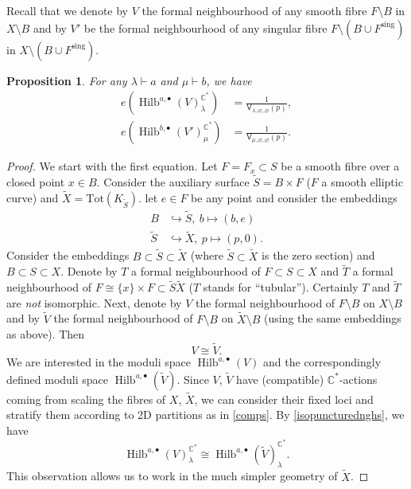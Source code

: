 \documentclass{amsart}
\newtheorem{proposition}[theorem]{Proposition}
\theoremstyle{definition}
\newcommand{\CC} {\mathbb{C}}          %
\newcommand{\sfV}{\mathsf{V}}
\newcommand{\Hilb}{\operatorname{Hilb}}
\newcommand{\sing}{\operatorname{sing}}
\begin{document}
Recall that we denote by $V$ the formal neighbourhood of any smooth fibre $F \setminus B$ in $X \setminus B$ and by $V'$ be the formal neighbourhood of any singular fibre $F \setminus (B \cup F^{\sing})$ in $X \setminus (B \cup F^{\sing})$. 
\begin{proposition}
For any $\lambda \vdash a$ and $\mu \vdash b$, we have
\begin{align*}
e(\Hilb^{a,\bullet}(V)_{\lambda}^{\CC^*}) &= \frac{1}{\sfV_{\lambda,\varnothing,\varnothing}(p)}, \\
e(\Hilb^{b,\bullet}(V')_{\mu}^{\CC^*}) &= \frac{1}{\sfV_{\mu,\varnothing,\varnothing}(p)}.
\end{align*}
\end{proposition}
\begin{proof}
We start with the first equation. Let $F = F_x \subset S$ be a smooth fibre over a closed point $x \in B$. Consider the auxiliary surface $\tilde{S} = B \times F$ ($F$ a smooth elliptic curve) and $\tilde{X} = \mathrm{Tot}(K_{\tilde{S}})$. let $e \in F$ be any point and consider the embeddings 
\begin{align*}
B &\hookrightarrow \tilde{S}, \ b \mapsto (b,e) \\
\tilde{S} &\hookrightarrow \tilde{X}, \ p \mapsto (p,0).
\end{align*}
Consider the embeddings $B \subset \tilde{S} \subset \tilde{X}$ (where $\tilde{S} \subset \tilde{X}$ is the zero section) and $B \subset S \subset X$. Denote by $T$ a formal neighbourhood of $F \subset S \subset X$ and $\tilde{T}$ a formal neighbourhood of $F \cong \{x\} \times F \subset \tilde{S} \tilde{X}$ ($T$ stands for ``tubular''). Certainly $T$ and $\tilde{T}$ are \emph{not} isomorphic. Next, denote by $V$ the formal neighbourhood of $F \setminus B$ on $X \setminus B$ and by $\tilde{V}$ the formal neighbourhood of $F \setminus B$ on $\tilde{X} \setminus B$ (using the same embeddings as above). Then 
\begin{equation} \label{isopuncturednghs}
V \cong \tilde{V}.
\end{equation}
We are interested in the moduli space $\Hilb^{a,\bullet}(V)$ and the correspondingly defined moduli space $\Hilb^{a,\bullet}(\tilde{V})$. Since $V$, $\tilde{V}$ have (compatible) $\CC^*$-actions coming from scaling the fibres of $X$, $\tilde{X}$, we can consider their fixed loci and stratify them according to 2D partitions as in \ref{comps}. By \eqref{isopuncturednghs}, we have    
$$
\Hilb^{a,\bullet}(V)_{\lambda}^{\CC^*} \cong \Hilb^{a,\bullet}(\tilde{V})_{\lambda}^{\CC^*}.
$$
This observation allows us to work in the much simpler geometry of $\tilde{X}$.


\end{proof}
\end{document}

